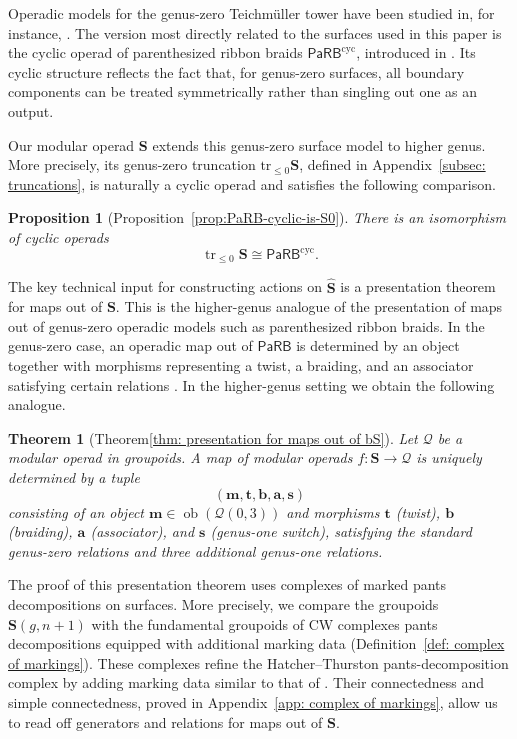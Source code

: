 \documentclass{amsart}
\newcommand{\calQ}{\mathcal{Q}}
\newcommand{\bS}{\mathbf{S}}
\newcommand{\PaRB}{\mathsf{PaRB}}
\newcommand{\ob}{\operatorname{ob}}
\newcommand{\trun}[1]{\mathrm{tr}_{\leq{#1}}}
\newtheorem*{prop*}{Proposition}%
\newtheorem*{thm*}{Theorem}
\theoremstyle{definition}
\numberwithin{equation}{section}
\begin{document}
Operadic models for the genus-zero Teichm\"uller tower have been studied in, for instance, \cite{FresseBook1,BN,willwacher2015m,Horel_profinite_groupoids,Boavida-Horel-Robertson,robertson2025grothendieck}. The version most directly related to the surfaces used in this paper is the cyclic operad of parenthesized ribbon braids $\PaRB^{\mathrm{cyc}}$, introduced in \cite{campos2019configuration}. Its cyclic structure reflects the fact that, for genus-zero surfaces, all boundary components can be treated symmetrically rather than singling out one as an output.

Our modular operad $\bS$ extends this genus-zero surface model to higher genus. More precisely, its genus-zero truncation $\trun{0}\bS$, defined in Appendix~\ref{subsec: truncations}, is naturally a cyclic operad and satisfies the following comparison.


\begin{prop*}[Proposition~\ref{prop:PaRB-cyclic-is-S0}]
There is an isomorphism of cyclic operads
    \[\operatorname{tr}_{\leq 0}\mathbf S \cong \PaRB^{\mathrm{cyc}}. \]
\end{prop*}

\medskip

The key technical input for constructing actions on $\widehat{\bS}$ is a presentation theorem for maps out of $\bS$. This is the higher-genus analogue of the presentation of maps out of genus-zero operadic models such as parenthesized ribbon braids. In the genus-zero case, an operadic map out of $\PaRB$ is determined by an object together with morphisms representing a twist, a braiding, and an associator satisfying certain relations \cite{FresseBook1,Boavida-Horel-Robertson}. In the higher-genus setting we obtain the following analogue.

\begin{thm*}[Theorem\ref{thm: presentation for maps out of bS}]
    Let $\calQ$ be a modular operad in groupoids. A map of modular operads $f:\bS\longrightarrow \calQ$ is uniquely determined by a tuple
        \[ (\mathbf{m},\mathbf{t},\mathbf{b},\mathbf{a},\mathbf{s}) \]
consisting of an object $\mathbf{m}\in \ob(\calQ(0,3))$ 
and morphisms $\mathbf{t}$ (twist), $\mathbf{b}$ (braiding), $\mathbf{a}$ (associator), and $\mathbf{s}$ (genus-one switch), satisfying the standard genus-zero relations and three additional genus-one relations.
\end{thm*}

The proof of this presentation theorem uses complexes of marked pants decompositions on surfaces. More precisely, we compare the groupoids $\bS(g,n+1)$ with the fundamental groupoids of CW complexes pants decompositions equipped with additional marking data (Definition~\ref{def: complex of markings}). These complexes refine the Hatcher--Thurston pants-decomposition complex \cite{Hatcher_Thurston} by adding marking data similar to that of \cite{bk_marked_surfaces}. Their connectedness and simple connectedness, proved in Appendix~\ref{app: complex of markings}, allow us to read off generators and relations for maps out of $\bS$.
\end{document}
